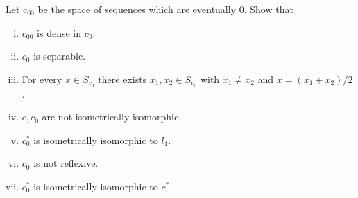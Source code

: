 \documentclass{article}
\begin{document}
 Let $c_{00}$ be the space of sequences which are eventually $0$. Show that
\begin{enumerate}[i)]
\item $c_{00}$ is dense in $c_0$.
\item $c_0$ is separable.
\item For every $x \in S_{c_0}$ there exists $x_1, x_2 \in S_{c_0}$ with $x_1 \neq x_2$  and $x = (x_1 + x_2)/2$.
\item $c, c_0$ are not isometrically isomorphic.
\item $c_0^*$ is isometrically isomorphic to $l_1$.
\item $c_0$ is not reflexive.
\item $c_0^*$ is isometrically isomorphic to $c^*$.
\end{enumerate}
\end{document}
